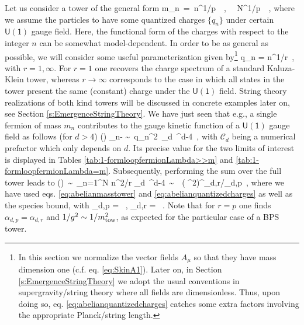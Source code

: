 Let us consider a tower of the general form
%
\beq
	m_n\, =\, n^{1/p}\, \Mt\, , \qquad  \LSP\, \simeq\, N^{1/p}\, \Mt\, ,
	\label{eq:abelianmasstower}
\eeq
%
where we assume the particles to have some quantized charges $\{q_n\}$ under certain $\mathsf{U(1)}$ gauge field. Here, the functional form of the charges with respect to the integer $n$ can be somewhat model-dependent. In order to be as general as possible, we will consider some useful parameterization given by\footnote{In this section we normalize the vector fields $A_{\mu}$ so that they have mass dimension one (c.f. eq. \eqref{eq:SkinA1}). Later on, in Section \ref{s:EmergenceStringTheory} we adopt the usual conventions in supergravity/string theory where all fields are dimensionless. Thus, upon doing so, eq. \eqref{eq:abelianquantizedcharges} catches some extra factors involving the appropriate Planck/string length.}
%
\beq
	q_n =  n^{1/r}\, ,
	\label{eq:abelianquantizedcharges}
\eeq
%
with $r=1,\infty$. For $r=1$ one recovers the charge spectrum of a standard Kaluza-Klein tower, whereas $r \to \infty$ corresponds to the case in which all states in the tower present the same (constant) charge under the $\mathsf{U(1)}$ field. String theory realizations of both kind towers will be discussed in concrete examples later on, see Section \ref{s:EmergenceStringTheory}. %
We have just seen that e.g., a single fermion of mass $m_n$ contributes to the gauge kinetic function of a $\mathsf{U(1)}$ gauge field as follows (for $d>4$)
%
\beq
	\delta \left(\right) \bigg\rvert_{n-} \sim\,  q_n^2\,  _d\, \LSP^{d-4}\, ,
\eeq
%
with $\mathcal{C}_d$ being a numerical prefactor which only depends on $d$. Its precise value for the two limits of interest is displayed in Tables \ref{tab:1-formloopfermionLambda>>m} and \ref{tab:1-formloopfermionLambda=m}. Subsequently, performing the sum over the full tower leads to
%
\beq\label{eq:gaugeemergenceddimensions}
	\delta \left(\right)\, \sim\, \sum_{n=1}^N n^{2/r} _d\, \LSP^{d-4}\, \sim\, \, \left( {\Mt^2}\right)^{\alpha_{d,r}/\alpha_{d,p}}\, ,
\eeq
%
where we have used eqs. \eqref{eq:abelianmasstower} and \eqref{eq:abelianquantizedcharges} as well as the species bound, with
%
\beq
	\alpha_{d,p} = \, , \qquad  \alpha_{d,r} = \, .
	\label{eq:dosalphas}
\eeq
%
Note that for $r=p$ one finds $\alpha_{d,p} =\alpha_{d,r}$ and $1/g^2\sim 1/m_{\text{tow}}^2$, as expected for the particular case of a BPS tower. 

